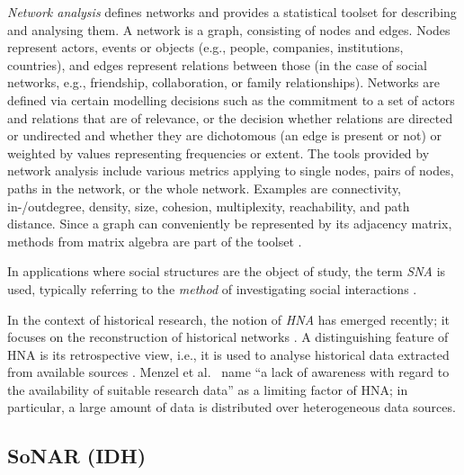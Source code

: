 \emph{Network analysis}
defines networks and provides a statistical toolset for describing and analysing them.
A network is a graph, consisting of nodes and edges.
Nodes represent actors, events or objects (e.g., people, companies, institutions, countries),
and edges represent relations between those (in the case of social networks, e.g.,
friendship, collaboration, or family relationships).
Networks are defined via certain modelling decisions
such as the commitment to a set of actors and relations that are of relevance,
or the decision whether relations are directed or undirected
and whether they are dichotomous (an edge is present or not)
or weighted by values representing frequencies or extent.
The tools provided by network analysis include
various metrics applying to single nodes, pairs of nodes, paths in the network,
or the whole network. %
Examples are connectivity, in-/outdegree, density,
size, cohesion, multiplexity, reachability, and path distance.
Since a graph can conveniently be represented by its adjacency matrix,
methods from matrix algebra are part of the toolset \autocite[cf.][§§1.1, 3.3, 5.3]{Jansen2003}.

In applications where social structures are the object of study,
the term \emph{\gls{SNA}} is used,
typically referring to the \emph{method} of investigating
social interactions \autocite{Otte2002}.

In the context of historical research,
the notion of \emph{\gls{HNA}}
has emerged recently; it focuses on the reconstruction of
historical networks \autocite{Menzel2020}.
A distinguishing feature of \gls{HNA} is its retrospective view,
i.e., it is used to analyse historical data extracted
from available sources \autocite{Fangerau2022}.
Menzel et al.\ \autocite*{Menzel2020} name
\enquote{a lack of awareness with regard to the availability of suitable research data}
as a limiting factor of \gls{HNA};
in particular, a large amount of data is distributed over heterogeneous data sources.

\subsection{SoNAR (IDH)}
\label{subsec:SoNAR_reports}

